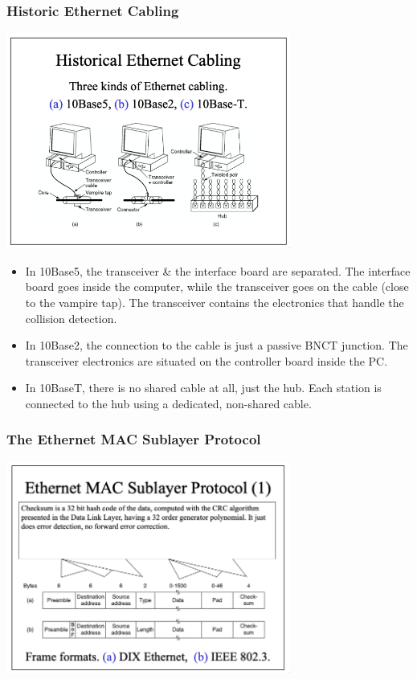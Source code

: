 \documentclass[11pt]{article}
\begin{document}
\subsubsection{Historic Ethernet Cabling}
\begin{center}
    \includegraphics[width=0.7\textwidth]{threekindsofethernetcabling.png}
\end{center}
\begin{itemize}
    \item   In 10Base5, the transceiver \& the interface board are separated. 
            The interface board goes inside the computer, while the transceiver goes on the cable (close to the vampire tap). 
            The transceiver contains the electronics that handle the collision detection.
    \item   In 10Base2, the connection to the cable is just a passive BNCT junction. 
            The transceiver electronics are situated on the controller board inside the PC.
    \item   In 10BaseT, there is no shared cable at all, just the hub. 
            Each station is connected to the hub using a dedicated, non-shared cable.
\end{itemize}

\subsubsection{The Ethernet MAC Sublayer Protocol}
\begin{center}
    \includegraphics[width=0.7\textwidth]{ethernetmacsublayerprotocol.png}
\end{center}
\end{document}
